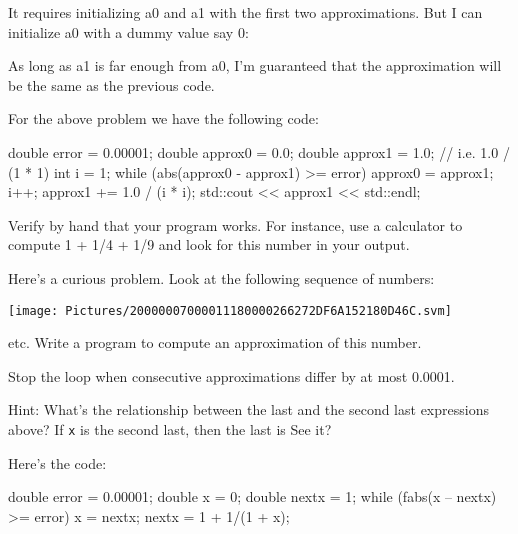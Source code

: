It requires initializing a0 and a1 with the first two approximations.
But I can initialize a0 with a dummy value say 0:


As long as a1 is far enough from a0, I'm guaranteed that
the approximation will be the same as the previous code.

For the above problem we have the following code:
\begin{console}
double error = 0.00001;
double approx0 = 0.0;
double approx1 = 1.0; // i.e. 1.0 / (1 * 1)
int i = 1;
while (abs(approx0 - approx1) >= error)
{     
      approx0 = approx1;
      i++;
      approx1 += 1.0 / (i * i);
      std::cout << approx1 << std::endl;
}
\end{console}

Verify by hand that your program works. For instance, use a calculator
to compute 1 + 1/4 + 1/9 and look for this number in your output.

Here's a curious problem. Look at the following sequence
of numbers:

\texttt{[image: Pictures/20000007000011180000266272DF6A152180D46C.svm]}

etc. Write a program to compute an approximation of this number.

Stop the loop when consecutive approximations differ by at most 0.0001.

Hint: What's the relationship between the last and the
second last expressions above? If \texttt{x} is the second last, then the
last is
See it?

Here's the code:
\begin{console}
double error = 0.00001;
double x = 0;
double nextx = 1;
while (fabs(x -- nextx) >= error)
{     
      x = nextx;
      nextx = 1 + 1/(1 + x);
}
\end{console}

